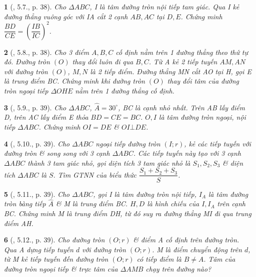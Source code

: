 \documentclass{article}
\newtheorem{baitoan}{}
\begin{document}
\begin{baitoan}[\cite{TLCT_THCS_Toan_9_hinh_hoc}, 5.7., p. 38]
	Cho $\Delta ABC$, I là tâm đường tròn nội tiếp tam giác. Qua I kẻ đường thẳng vuông góc với IA cắt 2 cạnh $AB,AC$ tại $D,E$. Chứng minh $\dfrac{BD}{CE} = \left(\dfrac{IB}{IC}\right)^2$.
\end{baitoan}

\begin{baitoan}[\cite{TLCT_THCS_Toan_9_hinh_hoc}, 5.8., p. 38]
	Cho 3 điểm $A,B,C$ cố định nằm trên 1 đường thẳng theo thứ tự đó. Đường tròn $(O)$ thay đổi luôn đi qua $B,C$. Từ A kẻ 2 tiếp tuyến $AM,AN$ với đường tròn $(O)$, $M,N$ là 2 tiếp điểm. Đường thẳng MN cắt AO tại H, gọi E là trung điểm BC. Chứng minh khi đường tròn $(O)$ thay đổi tâm của đường tròn ngoại tiếp $\Delta OHE$ nằm trên 1 đường thẳng cố định.
\end{baitoan}

\begin{baitoan}[\cite{TLCT_THCS_Toan_9_hinh_hoc}, 5.9., p. 39]
	Cho $\Delta ABC$, $\widehat{A} = 30^\circ$, BC là cạnh nhỏ nhất. Trên AB lấy điểm D, trên AC lấy điểm E thỏa $BD = CE = BC$. $O,I$ là tâm đường tròn ngoại, nội tiếp $\Delta ABC$. Chứng minh $OI = DE$ \& $OI\bot DE$.
\end{baitoan}

\begin{baitoan}[\cite{TLCT_THCS_Toan_9_hinh_hoc}, 5.10., p. 39]
	Cho $\Delta ABC$ ngoại tiếp đường tròn $(I;r)$, kẻ các tiếp tuyến với đường tròn \& song song với 3 cạnh $\Delta ABC$. Các tiếp tuyến này tạo với 3 cạnh $\Delta ABC$ thành 3 tam giác nhỏ, gọi diện tích 3 tam giác nhỏ là $S_1,S_2,S_3$ \& diện tích $\Delta ABC$ là $S$. Tìm {\rm GTNN} của biểu thức $\dfrac{S_1 + S_2 + S_3}{S}$.
\end{baitoan}

\begin{baitoan}[\cite{TLCT_THCS_Toan_9_hinh_hoc}, 5.11., p. 39]
	Cho $\Delta ABC$, gọi I là tâm đường tròn nội tiếp, $I_A$ là tâm đường tròn bàng tiếp $\widehat{A}$ \& M là trung điểm BC. $H,D$ là hình chiếu của $I,I_A$ trên cạnh BC. Chứng minh M là trung điểm DH, từ đó suy ra đường thẳng MI đi qua trung điểm AH.
\end{baitoan}

\begin{baitoan}[\cite{TLCT_THCS_Toan_9_hinh_hoc}, 5.12., p. 39]
	Cho đường tròn $(O;r)$ \& điểm A cố định trên đường tròn. Qua A dựng tiếp tuyến $d$ với đường tròn $(O;r)$. M là điểm chuyển động trên $d$, từ M kẻ tiếp tuyến đến đường tròn $(O;r)$ có tiếp điểm là $B\ne A$. Tâm của đường tròn ngoại tiếp \& trực tâm của $\Delta AMB$ chạy trên đường nào?
\end{baitoan}
\end{document}
